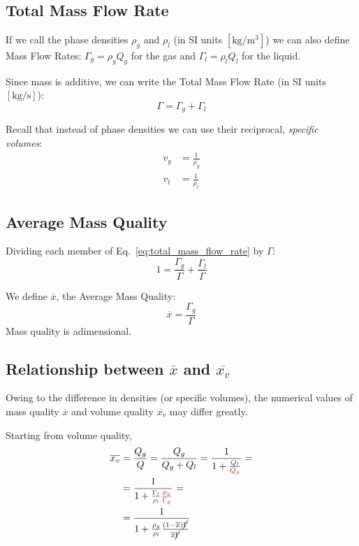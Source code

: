\subsection{Total Mass Flow Rate}
If we call the phase densities $\rho_g$ and $\rho_l$ (in SI units
$[\si{\kg\per\cubic\metre}]$) we can also define Mass Flow Rates: $\Gamma_g =
\rho_gQ_g$ for the gas and $\Gamma_l = \rho_lQ_l$ for the liquid.

Since mass is additive, we can write the Total Mass Flow Rate (in SI units
$[\si{\kg\per\s}]$):
\begin{equation}
    \Gamma = \Gamma_g + \Gamma_l
    \label{eq:total_mass_flow_rate}
\end{equation}

Recall that instead of phase densities we can use their reciprocal,
\emph{specific volumes}:
\begin{align*}
    v_g &= \frac{1}{\rho_g} \\
    v_l &= \frac{1}{\rho_l}
\end{align*}

\subsection{Average Mass Quality}
Dividing each member of Eq.~\ref{eq:total_mass_flow_rate} by $\Gamma$:
\begin{equation*}
    1 = \frac{\Gamma_g}{\Gamma} + \frac{\Gamma_l}{\Gamma}
\end{equation*}

We define $\overline{x}$, the Average Mass Quality:
\begin{equation*}
    \overline{x} = \frac{\Gamma_g}{\Gamma}
\end{equation*}
Mass quality is adimensional.

\subsection{Relationship between $\overline{x}$ and $\overline{x_v}$} Owing to
the difference in densities (or specific volumes), the numerical values of mass
quality $\overline{x}$ and volume quality $\overline{x_v}$ may differ greatly.

Starting from volume quality,
\begin{align*}
    \overline{x_v} &= \frac{Q_g}{Q} = \frac{Q_g}{Q_g+Q_l} = \frac{1}{1+\frac{\textcolor{Blue}{Q_l}}{\textcolor{BrickRed}{Q_g}}} = \\
    &= \frac{1}{1+\textcolor{Blue}{\frac{\Gamma_l}{\rho_l}}\textcolor{BrickRed}{\frac{\rho_g}{\Gamma_g}}} = \\
    &= \frac{1}{1+\frac{\rho_g}{\rho_l}\frac{(1-\overline{x})\cancel{\Gamma}}{\overline{x}\cancel{\Gamma}}}
\end{align*}


